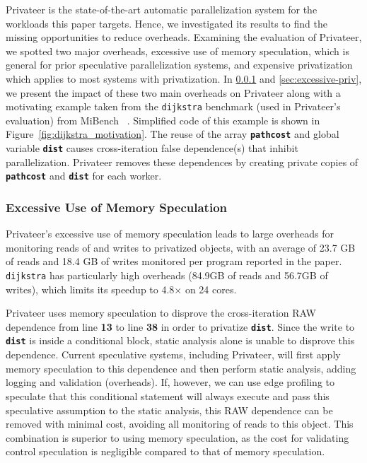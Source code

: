 Privateer is the state-of-the-art automatic parallelization system for the
workloads this paper targets. Hence, we investigated its results to find
the missing opportunities to reduce overheads.
%
Examining the evaluation of Privateer, we spotted two major overheads,
excessive use of memory speculation, which is general for prior speculative
parallelization systems, and expensive privatization which applies to
most systems with privatization.
%
In \ref{sec:excessive-memory-spec} and \ref{sec:excessive-priv}, we present
the impact of these two main overheads on Privateer along with a motivating
example taken from the \texttt{dijkstra} benchmark (used in Privateer's
evaluation) from MiBench ~\cite{guthaus:2001:iiwsc}. Simplified code of this example is
shown in Figure~\ref{fig:dijkstra_motivation}. The reuse of the array
\texttt{\textbf{pathcost}} and global variable \texttt{\textbf{dist}}
causes cross-iteration false dependence(s) that inhibit parallelization.
Privateer removes these dependences by creating private copies of
\texttt{\textbf{pathcost}} and \texttt{\textbf{dist}} for each worker.

\subsubsection{Excessive Use of Memory Speculation}
\label{sec:excessive-memory-spec}

Privateer's excessive use of memory speculation leads to large overheads
for monitoring reads of and writes to privatized objects, with an average
of 23.7 GB of reads and 18.4 GB of writes monitored per program reported in
the paper. \texttt{dijkstra} has particularly high overheads (84.9GB of
reads and 56.7GB of writes), which limits its speedup to 4.8$\times$ on 24
cores.


Privateer uses memory speculation to disprove the cross-iteration
RAW dependence from line \textbf{13} to line \textbf{38} in order to
privatize \texttt{\textbf{dist}}. Since the write to \texttt{\textbf{dist}}
is inside a conditional block, static analysis alone is unable to disprove
this dependence. Current speculative systems, including Privateer, will
first apply memory speculation to this dependence and then perform static
analysis, adding logging and validation (overheads). If, however, we can
use edge profiling to speculate that this conditional statement will always
execute and pass this speculative assumption to the static analysis, this
RAW dependence can be removed with minimal cost, avoiding all monitoring of
reads to this object. This combination is superior to using memory
speculation, as the cost for validating control speculation is negligible
compared to that of memory speculation.

